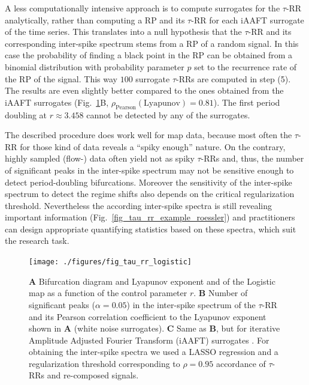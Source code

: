 \documentclass[entropy,article,submit,pdftex,moreauthors]{Definitions/mdpi}
\begin{document}
A less computationally intensive approach is to compute surrogates for the $\tau$-RR analytically, rather than computing a RP and its $\tau$-RR for each iAAFT surrogate of the 
time series. This translates into a null hypothesis 
that the $\tau$-RR and its corresponding inter-spike spectrum stems from a RP of a random signal. In this case the probability of finding a black point in the RP can be obtained 
from a binomial distribution with probability parameter $p$ set to the recurrence rate of the RP of the signal. This way $100$ surrogate $\tau$-RRs are computed in step (5). 
The results are even slightly better compared to the ones obtained from the iAAFT surrogates (Fig.~\ref{fig_tau_rr_logistic}B, $\rho_{\text{Pearson}}(\text{Lyapunov})=0.81$). 
The first period doubling at $r \approx 3.458$ cannot be detected by any of the surrogates.

The described procedure does work well for map data, because most often the $\tau$-RR for those kind of data reveals a ``spiky enough'' nature. 
On the contrary, highly sampled (flow-) data often yield not as 
spiky $\tau$-RRs and, thus, the number of significant peaks in the inter-spike spectrum may not be sensitive enough to detect period-doubling bifurcations. Moreover the sensitivity of the 
inter-spike spectrum to detect the regime shifts also depends on the critical regularization threshold. Nevertheless the 
according inter-spike spectra is still revealing important information (Fig.~\ref{fig_tau_rr_example_roessler}) and practitioners can design appropriate quantifying statistics based 
on these spectra, which suit the research task.

\begin{figure}
 \centering
 \texttt{[image: ./figures/fig\_tau\_rr\_logistic]}
 \caption{\textbf{A} Bifurcation diagram and Lyapunov exponent and of the Logistic map as a function of the control parameter $r$.
 \textbf{B} Number of significant peaks ($\alpha=0.05$) in the inter-spike spectrum of the $\tau$-RR and its Pearson correlation coefficient to the Lyapunov exponent shown in \textbf{A} 
 (white noise surrogates). 
 \textbf{C} Same as \textbf{B}, but for iterative Amplitude Adjusted Fourier Transform (iAAFT) surrogates \cite{Schreiber1996,Schreiber2000}. For obtaining the inter-spike spectra we used 
 a LASSO regression and a regularization threshold corresponding to $\rho=0.95$ accordance of $\tau$-RRs and re-composed signals.  
}
\label{fig_tau_rr_logistic}
\end{figure}


\end{document}
